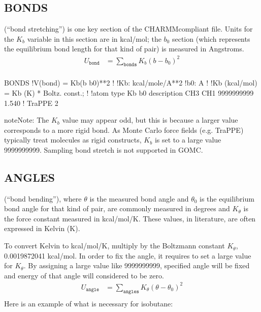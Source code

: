 \documentclass[letterpaper,10pt,english]{sphinxmanual}
\begin{document}
\subsection{BONDS}
\label{\detokenize{input_file:bonds}}
(“bond stretching”) is one key section of the CHARMM\sphinxhyphen{}compliant file. Units for the \(K_b\) variable in this section are in kcal/mol; the \(b_0\) section (which represents the equilibrium bond length for that kind of pair) is measured in Angstroms.
\begin{equation*}
\begin{split}U_{\texttt{bond}}&=\sum_{\texttt{bonds}} K_b(b-b_0)^2\\\end{split}
\end{equation*}
\begin{sphinxVerbatim}[commandchars=\\\{\}]
BONDS
!V(bond) = Kb(b \PYGZhy{} b0)**2
!
!Kb:  kcal/mole/A**2
!b0:  A
!
!Kb (kcal/mol) = Kb (K) * Boltz.  const.;
!
!atom type      Kb          b0     description
CH3   CH1   9999999999    1.540 !  TraPPE 2
\end{sphinxVerbatim}

\begin{sphinxadmonition}{note}{Note:}
The \(K_b\) value may appear odd, but this is because a larger value corresponds to a more rigid bond. As Monte Carlo force fields (e.g. TraPPE) typically treat molecules as rigid constructs, \(K_b\) is set to a large value \sphinxhyphen{} 9999999999. Sampling bond stretch is not supported in GOMC.
\end{sphinxadmonition}


\subsection{ANGLES}
\label{\detokenize{input_file:angles}}
(“bond bending”), where \(\theta\) is the measured bond angle and \(\theta_0\) is the equilibrium bond angle for that kind of pair, are commonly measured in degrees and \(K_\theta\) is the force constant measured in kcal/mol/K. These values, in literature, are often expressed in Kelvin (K).

To convert Kelvin to kcal/mol/K, multiply by the Boltzmann constant \textendash{} \(K_\theta\), 0.0019872041 kcal/mol. In order to fix the angle, it requires to set a large value for \(K_\theta\). By assigning a large value like 9999999999, specified angle will be fixed and energy of that angle will considered to be zero.
\begin{equation*}
\begin{split}U_{\texttt{angle}}&=\sum_{\texttt{angles}} K_{\theta}(\theta-\theta_0)^2\\\end{split}
\end{equation*}
Here is an example of what is necessary for isobutane:
\end{document}
